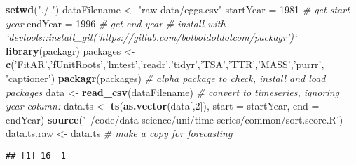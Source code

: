 \documentclass[]{article}
\newenvironment{Shaded}{\begin{snugshade}}{\end{snugshade}}
\newcommand{\CommentTok}[1]{\textcolor[rgb]{0.56,0.35,0.01}{\textit{#1}}}
\newcommand{\DataTypeTok}[1]{\textcolor[rgb]{0.13,0.29,0.53}{#1}}
\newcommand{\DecValTok}[1]{\textcolor[rgb]{0.00,0.00,0.81}{#1}}
\newcommand{\KeywordTok}[1]{\textcolor[rgb]{0.13,0.29,0.53}{\textbf{#1}}}
\newcommand{\NormalTok}[1]{#1}
\newcommand{\OperatorTok}[1]{\textcolor[rgb]{0.81,0.36,0.00}{\textbf{#1}}}
\newcommand{\StringTok}[1]{\textcolor[rgb]{0.31,0.60,0.02}{#1}}
\begin{document}


\begin{Shaded}
\begin{Highlighting}[]
\KeywordTok{setwd}\NormalTok{(}\StringTok{"./."}\NormalTok{)}
\NormalTok{dataFilename <-}\StringTok{ "raw-data/eggs.csv"}
\NormalTok{startYear =}\StringTok{ }\DecValTok{1981} \CommentTok{# get start year}
\NormalTok{endYear =}\StringTok{ }\DecValTok{1996} \CommentTok{# get end year}
\CommentTok{# install with `devtools::install_git('https://gitlab.com/botbotdotdotcom/packagr')`}
\KeywordTok{library}\NormalTok{(packagr)}
\NormalTok{packages <-}\StringTok{ }\KeywordTok{c}\NormalTok{(}\StringTok{'FitAR'}\NormalTok{,}\StringTok{'fUnitRoots'}\NormalTok{,}\StringTok{'lmtest'}\NormalTok{,}\StringTok{'readr'}\NormalTok{,}\StringTok{'tidyr'}\NormalTok{,}\StringTok{'TSA'}\NormalTok{,}\StringTok{'TTR'}\NormalTok{,}\StringTok{'MASS'}\NormalTok{,}\StringTok{'purrr'}\NormalTok{, }\StringTok{'captioner'}\NormalTok{)}
\KeywordTok{packagr}\NormalTok{(packages) }\CommentTok{# alpha package to check, install and load packages}
\NormalTok{data <-}\StringTok{ }\KeywordTok{read_csv}\NormalTok{(dataFilename)}
\CommentTok{# convert to timeseries, ignoring year column:}
\NormalTok{data.ts <-}\StringTok{ }\KeywordTok{ts}\NormalTok{(}\KeywordTok{as.vector}\NormalTok{(data[,}\DecValTok{2}\NormalTok{]), }\DataTypeTok{start =}\NormalTok{ startYear, }\DataTypeTok{end =}\NormalTok{ endYear) }
\KeywordTok{source}\NormalTok{(}\StringTok{'~/code/data-science/uni/time-series/common/sort.score.R'}\NormalTok{)}
\NormalTok{data.ts.raw <-}\StringTok{ }\NormalTok{data.ts }\CommentTok{# make a copy for forecasting}
\end{Highlighting}
\end{Shaded}

\begin{Shaded}
\end{Shaded}

\begin{verbatim}
## [1] 16  1
\end{verbatim}
\end{document}
